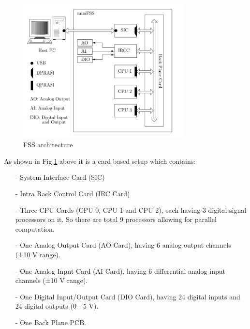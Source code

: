 \begin{figure}[th]
\centering
\includegraphics[width=250pt]{fig/fss_arch2.png}
\caption{FSS architecture\cite{Paper:fssmanual}}
\label{fig:fss_arch}
\end{figure}
As shown in Fig.\ref{fig:fss_arch} above it is a card based setup which contains:



\begin{itemize}
\item[-] System Interface Card (SIC)
\item[-] Intra Rack Control Card (IRC Card)
\item[-] Three CPU Cards (CPU 0, CPU 1 and CPU 2), each having 3 digital signal processors on it. So there are total 9 processors allowing for parallel computation.
\item[-] One Analog Output Card (AO Card), having 6 analog output channels (±10 V range).
\item[-]One Analog Input Card (AI Card), having 6 differential analog input channels (±10 V range).
\item[-] One Digital Input/Output Card (DIO Card), having 24 digital inputs and 24 digital outputs (0 - 5 V).
\item[-] One Back Plane PCB.
\end{itemize}

